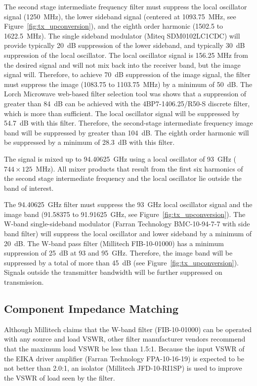 \documentclass[12pt,letterpaper]{article}
\begin{document}
The second stage intermediate frequency filter must suppress the local
oscillator signal (1250~MHz), the lower sideband signal (centered at
1093.75~MHz, see Figure~\ref{fig:tx_upconversion}), and the eighth
order harmonic (1502.5 to 1622.5~MHz). The single sideband modulator
(Miteq SDM0102LC1CDC) will provide typically 20~dB suppression of the
lower sideband, and typically 30~dB suppression of the local
oscillator. The local oscillator signal is 156.25 MHz from the desired
signal and will not mix back into the receiver band, but the image
signal will. Therefore, to achieve 70~dB suppression of the image
signal, the filter must suppress the image (1083.75 to 1103.75~MHz) by
a minimum of 50~dB. The Lorch Microwave web-based filter selection
tool was shows that a suppression of greater than 84~dB can be
achieved with the 4BP7-1406.25/R50-S discrete filter, which is more
than sufficient. The local oscillator signal will be suppressed by
54.7~dB with this filter. Therefore, the second-stage intermediate
frequency image band will be suppressed by greater than 104~dB. The
eighth order harmonic will be suppressed by a minimum of 28.3~dB with
this filter.

The signal is mixed up to 94.40625~GHz using a local oscillator of
93~GHz ($744\times125$~MHz). All mixer products that result from the
first six harmonics of the second stage intermediate frequency and the
local oscillator lie outside the band of interest.

The 94.40625~GHz filter must suppress the 93~GHz local oscillator
signal and the image band (91.58375 to 91.91625~GHz, see
Figure~\ref{fig:tx_upconversion}). The W-band single-sideband
modulator (Farran Technology BMC-10-94-7-7 with side band filter) will
suppress the local oscillator and lower sideband by a minimum of
20~dB. The W-band pass filter (Millitech FIB-10-01000) has a minimum
suppression of 25~dB at 93 and 95~GHz. Therefore, the image band will
be suppressed by a total of more than 45~dB (see
Figure~\ref{fig:tx_upconversion}). Signals outside the transmitter
bandwidth will be further suppressed on transmission.

\subsection{Component Impedance Matching}

Although Millitech claims that the W-band filter (FIB-10-01000) can be
operated with any source and load VSWR, other filter manufacturer
vendors recommend that the maximum load VSWR be less than
1.5:1. Because the input VSWR of the EIKA driver amplifier (Farran
Technology FPA-10-16-19) is expected to be not better than 2.0:1, an
isolator (Millitech JFD-10-RI1SP) is used to improve the VSWR of load
seen by the filter.
\end{document}
